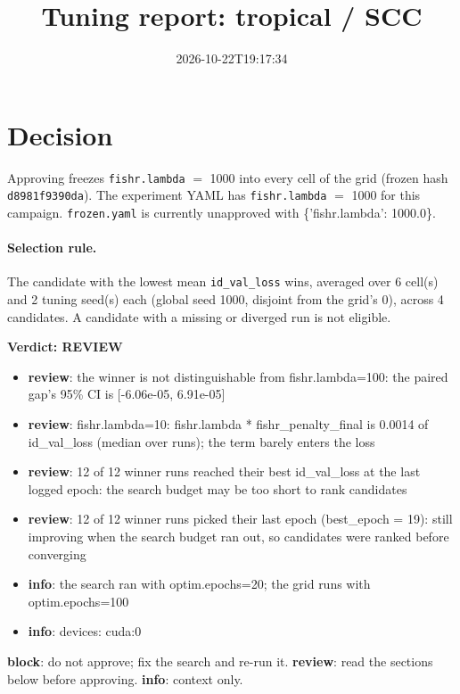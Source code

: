 \documentclass[10pt]{article}
\title{Tuning report: tropical / SCC}
\date{2026-10-22T19:17:34}
\begin{document}
\maketitle

\section{Decision}
Approving freezes
\texttt{fishr.lambda} $=$ 1000 into every cell of the grid (frozen hash \texttt{d8981f9390da}).
The experiment YAML has
\texttt{fishr.lambda} $=$ 1000 for this campaign.
\texttt{frozen.yaml} is currently unapproved with \{'fishr.lambda': 1000.0\}.

\paragraph{Selection rule.} The candidate with the lowest mean \texttt{id\_val\_loss} wins, averaged over 6 cell(s) and 2 tuning seed(s) each (global seed 1000, disjoint from the grid's 0), across 4 candidates. A candidate with a missing or diverged run is not eligible.

\begin{framed}
\noindent\textbf{Verdict: \textcolor{orange!85!black}{REVIEW}}
\begin{itemize}\setlength\itemsep{0pt}
\item \textbf{review}: the winner is not distinguishable from fishr.lambda=100: the paired gap's 95\% CI is [-6.06e-05, 6.91e-05]
\item \textbf{review}: fishr.lambda=10: fishr.lambda * fishr\_penalty\_final is 0.0014 of id\_val\_loss (median over runs); the term barely enters the loss
\item \textbf{review}: 12 of 12 winner runs reached their best id\_val\_loss at the last logged epoch: the search budget may be too short to rank candidates
\item \textbf{review}: 12 of 12 winner runs picked their last epoch (best\_epoch = 19): still improving when the search budget ran out, so candidates were ranked before converging
\item \textbf{info}: the search ran with optim.epochs=20; the grid runs with optim.epochs=100
\item \textbf{info}: devices: cuda:0
\end{itemize}
\end{framed}
\noindent\textbf{block}: do not approve; fix the search and re-run it. \textbf{review}: read the sections below before approving. \textbf{info}: context only.
\end{document}
